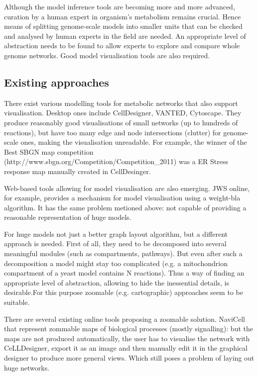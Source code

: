 \documentclass{bmcart}
\begin{document}
Although the model inference tools are becoming more and more advanced, curation by a human expert in organism's metabolism remains crucial. Hence means of splitting genome-scale models into smaller units that can be checked and analysed by human experts in the field are needed. An appropriate level of abstraction needs to be found to allow experts to explore and compare whole genome networks. Good model visualisation tools are also required.

\subsection*{Existing approaches}
There exist various modelling tools for metabolic networks that also support visualisation. Desktop ones include CellDesigner\cite{Funahashi2008}, VANTED\cite{Rohn2012}, Cytoscape\cite{Smoot2011}. They produce reasonably good visualisations of small networks (up to hundreds of reactions), but have too many edge and node intersections (clutter) for genome-scale ones, making the visualisation unreadable. For example,  the winner of the Best SBGN map competition (http://www.sbgn.org/Competition/Competition\_2011) was a ER Stress response\cite{Groenendyk2010} map manually created in CellDesinger.

Web-based tools allowing for model visualisation are also emerging.  JWS online, for example, provides a mechanism for model visualisation using a weight-bla algorithm. It has the same problem metioned above: not capable of providing a reasonable representation of huge models.

For huge models not just a better graph layout algorithm, but a different approach is needed. First of all, they need to be decomposed into several meaningful modules (such as compartments, pathways). But even after such a decomposition a model might stay too complicated (e.g. a mitochondrion compartment of a yeast model\cite{Heavner12} contains N reactions). Thus a way of finding an appropriate level of abstraction, allowing to hide the inessential details, is desirable.For this purpose zoomable (e.g. cartographic) approaches seem to be suitable. 

There are several existing online tools proposing a zoomable solution. NaviCell\cite{Kuperstein2013} that represent zommable maps of biological processes (mostly signalling): but the maps are not produced automatically, the user has to visualise the network with CeLLDesigner, export it as an image and then manually edit it in the graphical designer to produce more general views. Which still poses a problem of laying out huge networks. 
\end{document}
